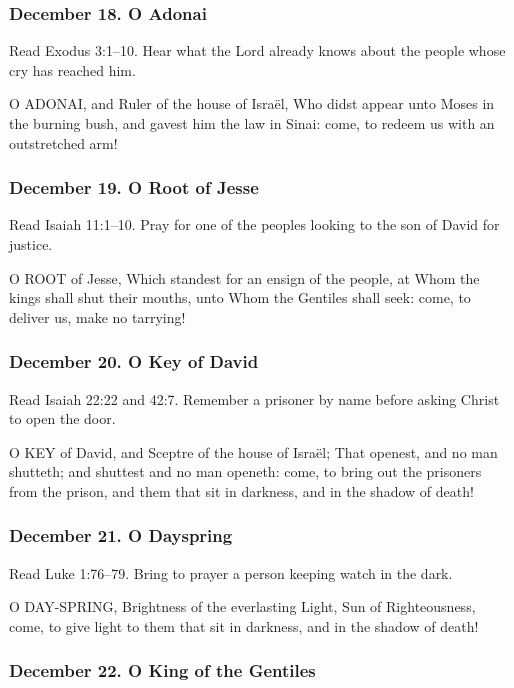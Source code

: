 \subsubsection*{December 18. O Adonai}

Read Exodus 3:1--10. Hear what the Lord already knows about the people whose cry has reached him.

O ADONAI, and Ruler of the house of Israël, Who didst appear unto Moses in the burning bush, and gavest him the law in Sinai: come, to redeem us with an outstretched arm!

\subsubsection*{December 19. O Root of Jesse}

Read Isaiah 11:1--10. Pray for one of the peoples looking to the son of David for justice.

O ROOT of Jesse, Which standest for an ensign of the people, at Whom the kings shall shut their mouths, unto Whom the Gentiles shall seek: come, to deliver us, make no tarrying!

\subsubsection*{December 20. O Key of David}

Read Isaiah 22:22 and 42:7. Remember a prisoner by name before asking Christ to open the door.

O KEY of David, and Sceptre of the house of Israël; That openest, and no man shutteth; and shuttest and no man openeth: come, to bring out the prisoners from the prison, and them that sit in darkness, and in the shadow of death!

\subsubsection*{December 21. O Dayspring}

Read Luke 1:76--79. Bring to prayer a person keeping watch in the dark.

O DAY-SPRING, Brightness of the everlasting Light, Sun of Righteousness, come, to give light to them that sit in darkness, and in the shadow of death!

\subsubsection*{December 22. O King of the Gentiles}

